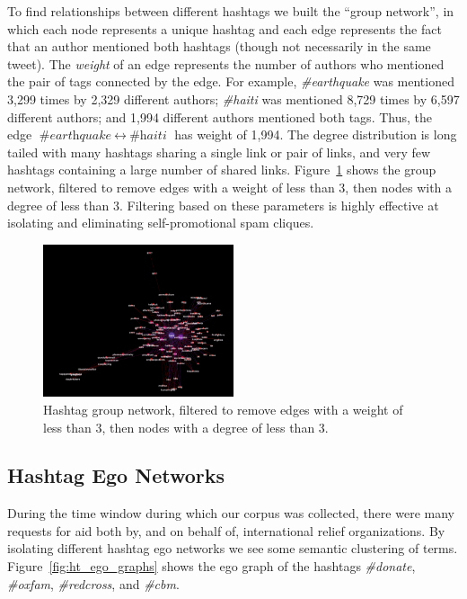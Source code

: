 \documentclass[a4paper, 11pt, titlepage]{article}
\begin{document}
To find relationships between different hashtags we built the ``group network'', in which each node represents a unique hashtag and each edge represents the fact that an author mentioned both hashtags (though not necessarily in the same tweet). The \textit{weight} of an edge represents the number of authors who mentioned the pair of tags connected by the edge. For example, \textit{\#earthquake} was mentioned 3,299 times by 2,329 different authors; \textit{\#haiti} was mentioned 8,729 times by 6,597 different authors; and 1,994 different authors mentioned both tags. Thus, the edge $\textit{\#earthquake}~\leftrightarrow~\textit{\#haiti}$ has weight of 1,994. The degree distribution is long tailed with many hashtags sharing a single link or pair of links, and very few hashtags containing a large number of shared links. Figure~\ref{fig:ht_group_network} shows the group network, filtered to remove edges with a weight of less than 3, then nodes with a degree of less than 3. Filtering based on these parameters is highly effective at isolating and eliminating self-promotional spam cliques.

\begin{figure}[h]
\centering
\includegraphics[width=0.5\textwidth]{../figures/ht_group_network}
\caption{Hashtag group network, filtered to remove edges with a weight of less than 3, then nodes with a degree of less than 3. }
\label{fig:ht_group_network}
\end{figure}

\subsection{Hashtag Ego Networks}
During the time window during which our corpus was collected, there were many requests for aid both by, and on behalf of, international relief organizations. By isolating different hashtag ego networks we see some semantic clustering of terms. Figure~\ref{fig:ht_ego_graphs} shows the ego graph of the hashtags \textit{\#donate}, \textit{\#oxfam}, \textit{\#redcross}, and \textit{\#cbm}. 
\end{document}
